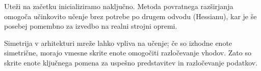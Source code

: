 Uteži na začetku inicializiramo naključno. Metoda povratnega razširjanja omogoča učinkovito učenje brez potrebe po drugem odvodu (Hessianu), kar je še posebej pomembno za izvedbo na realni strojni opremi.

Simetrija v arhitekturi mreže lahko vpliva na učenje; če so izhodne enote simetrične, morajo vmesne skrite enote omogočiti razločevanje vhodov. Zato so skrite enote ključnega pomena za uspešno predstavitev in razločevanje podatkov.

